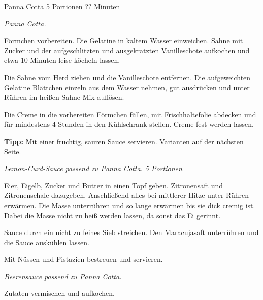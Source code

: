 \begin{recipe}{Panna Cotta} {5 Portionen} {?? Minuten}

  \freeform
  \textit{Panna Cotta.}


  Förmchen vorbereiten.
  Die Gelatine in kaltem Wasser einweichen.
  Sahne mit Zucker und der aufgeschlitzten und ausgekratzten Vanilleschote aufkochen und etwa 10 Minuten leise köcheln lassen.

  \newstep
  Die Sahne vom Herd ziehen und die Vanilleschote entfernen.
  Die aufgeweichten Gelatine Blättchen einzeln aus dem Wasser nehmen, gut ausdrücken und unter Rühren im heißen Sahne-Mix auflösen.

  \newstep
  Die Creme in die vorbereiten Förmchen füllen, mit Frischhaltefolie abdecken und für mindestens 4 Stunden in den Kühlschrank stellen.
  Creme fest werden lassen.

  \freeform
  \hrulefill

  \freeform
  \textbf{Tipp:}
  Mit einer fruchtig, sauren Sauce servieren. Varianten auf der nächsten Seite.

  \newpage

  \freeform
  \textit{Lemon-Curd-Sauce passend zu Panna Cotta. 5 Portionen}


  Eier, Eigelb, Zucker und Butter in einen Topf geben.
  Zitronensaft und Zitronenschale dazugeben.
  Anschließend alles bei mittlerer Hitze unter Rühren erwärmen.
  Die Masse unterrühren und so lange erwärmen bis sie dick cremig ist.
  Dabei die Masse nicht zu heiß werden lassen, da sonst das Ei gerinnt.

  \newstep
  Sauce durch ein nicht zu feines Sieb streichen.
  Den Maracujasaft unterrühren und die Sauce auskühlen lassen.

  \newstep
  Mit Nüssen und Pistazien bestreuen und servieren.

  \freeform
  \hrulefill

  \freeform
  \textit{Beerensauce passend zu Panna Cotta.}


  Zutaten vermischen und aufkochen.

  \freeform
  \hrulefill

\end{recipe}
